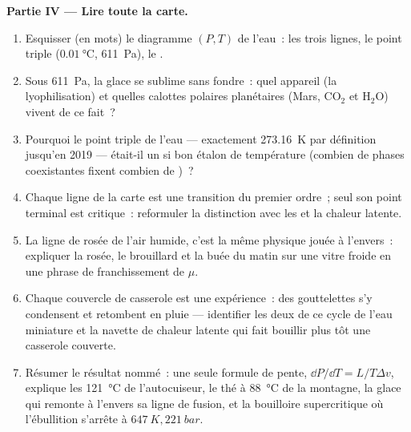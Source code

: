 \begin{problem}
\medskip\noindent\textbf{Partie IV --- Lire toute la carte.}
\begin{enumerate}[resume]
  \item Esquisser (en mots) le diagramme $(P, T)$ de l'eau~: les
        trois lignes, le point triple ($\qty{0.01}{\celsius}$,
        \qty{611}{Pa}), le .
  \item Sous \qty{611}{Pa}, la glace se sublime sans fondre~: quel
        appareil (la lyophilisation) et quelles calottes polaires
        planétaires (Mars, CO$_2$ et H$_2$O) vivent de ce fait~?
  \item Pourquoi le point triple de l'eau --- exactement
        \qty{273.16}{K} par définition jusqu'en 2019 --- était-il
        un si bon étalon de température (combien de phases
        coexistantes fixent combien de )~?
  \item Chaque ligne de la carte est une transition du premier
        ordre~; seul son point terminal est critique~: reformuler la
        distinction avec les  et la chaleur
        latente.
  \item La ligne de rosée de l'air humide, c'est la même physique
        jouée à l'envers~: expliquer la rosée, le brouillard et la
        buée du matin sur une vitre froide en une phrase de
        franchissement de $\mu$.
  \item Chaque couvercle de casserole est une expérience~: des
        gouttelettes s'y condensent et retombent en pluie ---
        identifier les deux  de ce cycle de
        l'eau miniature et la navette de chaleur latente qui fait
        bouillir plus tôt une casserole couverte.
  \item Résumer le résultat nommé~: une seule formule de pente,
        $\dd P/
        \dd T = L/T\Delta v$, explique les \qty{121}{\celsius} de
        l'autocuiseur, le thé à \qty{88}{\celsius} de la montagne,
        la glace qui remonte à l'envers sa ligne de fusion, et la
        bouilloire supercritique où l'ébullition s'arrête à
        $\qty{647}{K}, \qty{221}{bar}$.
\end{enumerate}
\end{problem}
